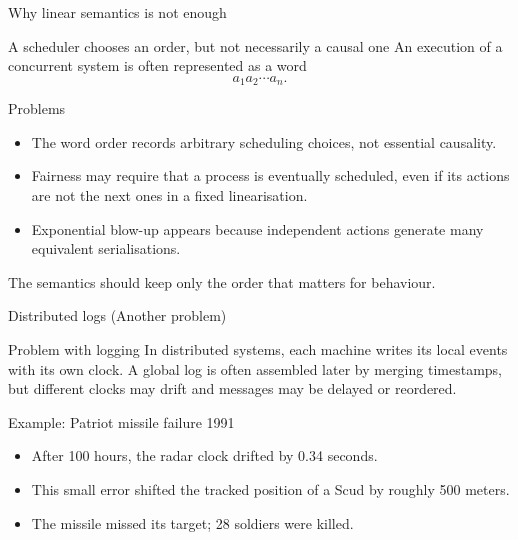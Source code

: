 \documentclass[t,11pt]{beamer}
\begin{document}
\begin{frame}{Why linear semantics is not enough}
  \begin{block}{A scheduler chooses an order, but not necessarily a causal one}
    An execution of a concurrent system is often represented as a word
    \[
      a_1a_2\cdots a_n.
    \]
  \end{block}
  \begin{block}{Problems}
    \begin{itemize}
      \item The word order records arbitrary scheduling choices, not essential causality.
      \item Fairness may require that a process is eventually scheduled, even if its actions are not the next ones in a fixed linearisation.
      \item Exponential blow-up appears because independent actions generate many equivalent serialisations.
    \end{itemize}
  \end{block}
  \centering\large The semantics should keep only the order that matters for behaviour.
\end{frame}

\begin{frame}{Distributed logs (Another problem)}
  \begin{block}{Problem with logging}
    In distributed systems, each machine writes its local events with its own clock. A global log is often assembled later by merging timestamps, but different clocks may drift and messages may be delayed or reordered.
  \end{block}
  \begin{block}{Example: Patriot missile failure 1991}
    \begin{itemize}
      \item After 100 hours, the radar clock drifted by 0.34 seconds.
      \item This small error shifted the tracked position of a Scud by roughly 500 meters.
      \item The missile missed its target; 28 soldiers were killed.
    \end{itemize}
  \end{block}

\end{frame}
\end{document}

